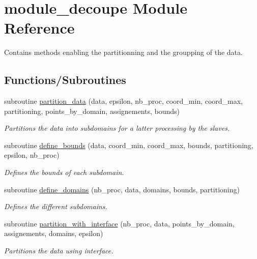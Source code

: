 \hypertarget{namespacemodule__decoupe}{}\section{module\+\_\+decoupe Module Reference}
\label{namespacemodule__decoupe}


Contains methods enabling the partitionning and the groupping of the data.  


\subsection*{Functions/\+Subroutines}
\begin{DoxyCompactItemize}
\item 
subroutine \hyperlink{namespacemodule__decoupe_a20e9d554b6d62aa1aac7be71c223132e}{partition\+\_\+data} (data, epsilon, nb\+\_\+proc, coord\+\_\+min, coord\+\_\+max, partitioning, points\+\_\+by\+\_\+domain, assignements, bounds)
\begin{DoxyCompactList}\small\item\em Partitions the data into subdomains for a latter processing by the slaves. \end{DoxyCompactList}\item 
subroutine \hyperlink{namespacemodule__decoupe_ab1bd43de3891732cdf5803c4d86544dd}{define\+\_\+bounds} (data, coord\+\_\+min, coord\+\_\+max, bounds, partitioning, epsilon, nb\+\_\+proc)
\begin{DoxyCompactList}\small\item\em Defines the bounds of each subdomain. \end{DoxyCompactList}\item 
subroutine \hyperlink{namespacemodule__decoupe_afc4d3c1d1e2c287779200be5cf9d8205}{define\+\_\+domains} (nb\+\_\+proc, data, domains, bounds, partitioning)
\begin{DoxyCompactList}\small\item\em Defines the different subdomains. \end{DoxyCompactList}\item 
subroutine \hyperlink{namespacemodule__decoupe_a523f2f851f39859d9c60114c934b2d66}{partition\+\_\+with\+\_\+interface} (nb\+\_\+proc, data, points\+\_\+by\+\_\+domain, assignements, domains, epsilon)
\begin{DoxyCompactList}\small\item\em Partitions the data using interface. \end{DoxyCompactList}\item 

\end{DoxyCompactItemize}
